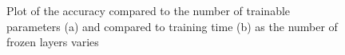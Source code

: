 \begin{figure}
    \centering
    \caption{Plot of the accuracy compared to the number of trainable parameters (a) and compared to training time (b) as the number of frozen layers varies}
    \label{fig:time_acc}
\end{figure}




